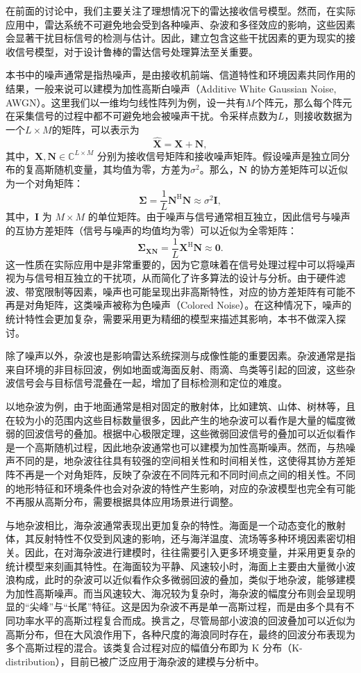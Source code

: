 在前面的讨论中，我们主要关注了理想情况下的雷达接收信号模型。然而，在实际应用中，雷达系统不可避免地会受到各种噪声、杂波和多径效应的影响，这些因素会显著干扰目标信号的检测与估计。因此，建立包含这些干扰因素的更为现实的接收信号模型，对于设计鲁棒的雷达信号处理算法至关重要。

本书中的噪声通常是指热噪声，是由接收机前端、信道特性和环境因素共同作用的结果，一般来说可以建模为加性高斯白噪声（Additive White Gaussian Noise, AWGN）。这里我们以一维均匀线性阵列为例，设一共有\( M \)个阵元，那么每个阵元在采集信号的过程中都不可避免地会被噪声干扰。令采样点数为\( L \)，则接收数据为一个\( L \times M \)的矩阵，可以表示为
\[
    \hat{\mathbf{X}} = \mathbf{X} + \mathbf{N},
\]
其中，\(\mathbf{X}, \mathbf{N} \in \mathbb{C}^{L \times M}\) 分别为接收信号矩阵和接收噪声矩阵。假设噪声是独立同分布的复高斯随机变量，其均值为零，方差为\( \sigma^2 \)。那么，\(\mathbf{N}\) 的协方差矩阵可以近似为一个对角矩阵：
\[
    \mathbf{\Sigma} = \frac{1}{L} \mathbf{N}^{\mathrm{H}} \mathbf{N} \approx \sigma^2 \mathbf{I},
\]
其中，\(\mathbf{I}\) 为 \(M \times M\) 的单位矩阵。由于噪声与信号通常相互独立，因此信号与噪声的互协方差矩阵（信号与噪声的均值均为零）可以近似为全零矩阵：
\[
    \mathbf{\Sigma}_{\mathbf{XN}} = \frac{1}{L} \mathbf{X}^{\mathrm{H}} \mathbf{N} \approx \mathbf{0}.
\]
这一性质在实际应用中是非常重要的，因为它意味着在信号处理过程中可以将噪声视为与信号相互独立的干扰项，从而简化了许多算法的设计与分析。由于硬件滤波、带宽限制等因素，噪声也可能呈现出非高斯特性，对应的协方差矩阵有可能不再是对角矩阵，这类噪声被称为色噪声（Colored Noise）。在这种情况下，噪声的统计特性会更加复杂，需要采用更为精细的模型来描述其影响，本书不做深入探讨。

除了噪声以外，杂波也是影响雷达系统探测与成像性能的重要因素。杂波通常是指来自环境的非目标回波，例如地面或海面反射、雨滴、鸟类等引起的回波，这些杂波信号会与目标信号混叠在一起，增加了目标检测和定位的难度。

以地杂波为例，由于地面通常是相对固定的散射体，比如建筑、山体、树林等，且在较为小的范围内这些目标数量很多，因此产生的地杂波可以看作是大量的幅度微弱的回波信号的叠加。根据中心极限定理，这些微弱回波信号的叠加可以近似看作是一个高斯随机过程，因此地杂波通常也可以建模为加性高斯噪声。然而，与热噪声不同的是，地杂波往往具有较强的空间相关性和时间相关性，这使得其协方差矩阵不再是一个对角矩阵，反映了杂波在不同阵元和不同时间点之间的相关性。不同的地形特征和环境条件也会对杂波的特性产生影响，对应的杂波模型也完全有可能不再服从高斯分布，需要根据具体应用场景进行调整。

与地杂波相比，海杂波通常表现出更加复杂的特性。海面是一个动态变化的散射体，其反射特性不仅受到风速的影响，还与海洋温度、流场等多种环境因素密切相关。因此，在对海杂波进行建模时，往往需要引入更多环境变量，并采用更复杂的统计模型来刻画其特性。在海面较为平静、风速较小时，海面上主要由大量微小波浪构成，此时的杂波可以近似看作众多微弱回波的叠加，类似于地杂波，能够建模为加性高斯噪声。而当风速较大、海况较为复杂时，海杂波的幅度分布则会呈现明显的“尖峰”与“长尾”特征。这是因为杂波不再是单一高斯过程，而是由多个具有不同功率水平的高斯过程复合而成。换言之，尽管局部小波浪的回波叠加可以近似为高斯分布，但在大风浪作用下，各种尺度的海浪同时存在，最终的回波分布表现为多个高斯过程的混合。该类复合过程对应的幅值分布即为 K 分布（K-distribution），目前已被广泛应用于海杂波的建模与分析中。

